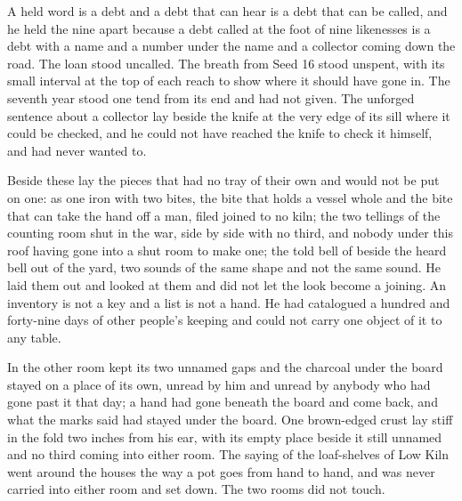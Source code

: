 A held word is a debt and a debt that can hear is a debt that can be called, and he held the nine apart because a debt called at the foot of nine likenesses is a debt with a name and a number under the name and a collector coming down the road. The loan stood uncalled. The breath from Seed 16 stood unspent, with its small interval at the top of each reach to show where it should have gone in. The seventh year stood one tend from its end and had not given. The unforged sentence about a collector lay beside the knife at the very edge of its sill where it could be checked, and he could not have reached the knife to check it himself, and had never wanted to.

Beside these lay the pieces that had no tray of their own and would not be put on one:  as one iron with two bites, the bite that holds a vessel whole and the bite that can take the hand off a man, filed joined to no kiln; the two tellings of the counting room shut in the war, side by side with no third, and nobody under this roof having gone into a shut room to make one; the told bell of  beside the heard bell out of the yard, two sounds of the same shape and not the same sound. He laid them out and looked at them and did not let the look become a joining. An inventory is not a key and a list is not a hand. He had catalogued a hundred and forty-nine days of other people's keeping and could not carry one object of it to any table.

\scenebreak

In the other room  kept its two unnamed gaps and the charcoal under the board stayed on a place of its own, unread by him and unread by anybody who had gone past it that day; a hand had gone beneath the board and come back, and what the marks said had stayed under the board. One brown-edged crust lay stiff in the fold two inches from his ear, with its empty place beside it still unnamed and no third coming into either room. The saying of the loaf-shelves of Low Kiln went around the houses the way a pot goes from hand to hand, and was never carried into either room and set down. The two rooms did not touch.

